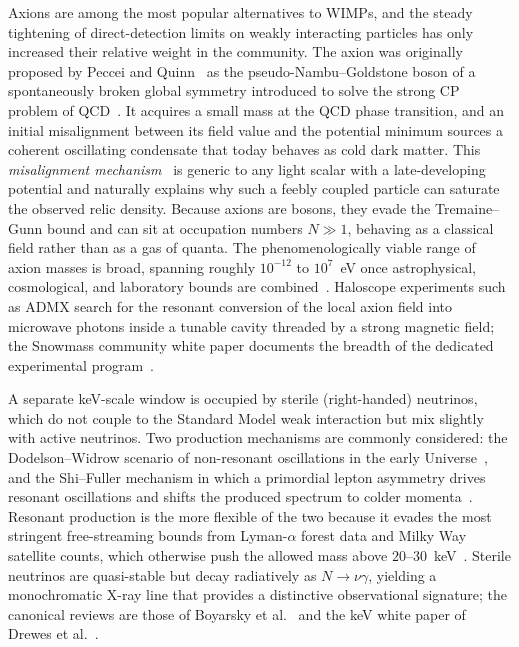 Axions are among the most popular alternatives to WIMPs, and the steady tightening of direct-detection limits on weakly interacting particles has only increased their relative weight in the community.
The axion was originally proposed by Peccei and Quinn~\cite{Peccei:1977hh} as the pseudo-Nambu--Goldstone boson of a spontaneously broken global symmetry introduced to solve the strong CP problem of QCD~\cite{Weinberg:1977ma,Wilczek:1977pj}.
It acquires a small mass at the QCD phase transition, and an initial misalignment between its field value and the potential minimum sources a coherent oscillating condensate that today behaves as cold dark matter.
This \emph{misalignment mechanism}~\cite{Preskill:1982cy,Abbott:1982af,Dine:1982ah} is generic to any light scalar with a late-developing potential and naturally explains why such a feebly coupled particle can saturate the observed relic density.
Because axions are bosons, they evade the Tremaine--Gunn bound and can sit at occupation numbers $N \gg 1$, behaving as a classical field rather than as a gas of quanta.
The phenomenologically viable range of axion masses is broad, spanning roughly $10^{-12}$ to $10^{7}$~eV once astrophysical, cosmological, and laboratory bounds are combined~\cite{Adams:2022pbo}.
Haloscope experiments such as ADMX search for the resonant conversion of the local axion field into microwave photons inside a tunable cavity threaded by a strong magnetic field; the Snowmass community white paper documents the breadth of the dedicated experimental program~\cite{Adams:2022pbo}.

A separate keV-scale window is occupied by sterile (right-handed) neutrinos, which do not couple to the Standard Model weak interaction but mix slightly with active neutrinos.
Two production mechanisms are commonly considered: the Dodelson--Widrow scenario of non-resonant oscillations in the early Universe~\cite{Dodelson:1993je}, and the Shi--Fuller mechanism in which a primordial lepton asymmetry drives resonant oscillations and shifts the produced spectrum to colder momenta~\cite{Shi:1998km}.
Resonant production is the more flexible of the two because it evades the most stringent free-streaming bounds from Lyman-$\alpha$ forest data and Milky Way satellite counts, which otherwise push the allowed mass above $20$--$30$~keV~\cite{Boyarsky:2018tvu}.
Sterile neutrinos are quasi-stable but decay radiatively as $N \to \nu\gamma$, yielding a monochromatic X-ray line that provides a distinctive observational signature; the canonical reviews are those of Boyarsky et al.~\cite{Boyarsky:2018tvu} and the keV white paper of Drewes et al.~\cite{Drewes:2016upu}.

